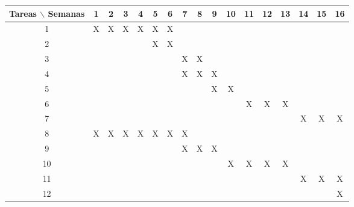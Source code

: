 \documentclass[preprint]{aastex62}
\begin{document}
  \begin{table}[htb]
    \begin{tabular}{|c|cccccccccccccccc| }
      \hline
      Tareas $\backslash$ Semanas & 1 & 2 & 3 & 4 & 5 & 6 & 7 & 8 & 9 & 10 & 11 & 12 & 13 & 14 & 15 & 16  \\
      \hline
      1 & X & X & X & X & X & X &   &   &   &   &   &   &   &   &   &   \\
      2 &   &   &   &   & X & X &   &   &   &   &   &   &   &   &   &   \\
      3 &   &   &   &   &   &   & X & X &   &   &   &   &   &   &   &   \\
      4 &   &   &   &   &   &   & X & X & X &   &   &   &   &   &   &   \\
      5 &   &   &   &   &   &   &   &   & X & X &   &   &   &   &   &   \\
      6 &   &   &   &   &   &   &   &   &   &   & X & X & X &   &   &   \\
      7 &   &   &   &   &   &   &   &   &   &   &   &   &   & X & X & X \\
      8 & X & X & X & X & X & X & X &   &   &   &   &   &   &   &   &   \\
      9 &   &   &   &   &   &   & X & X & X &   &   &   &   &   &   &   \\
      10&   &   &   &   &   &   &   &   &   & X & X & X & X &   &   &   \\
      11&   &   &   &   &   &   &   &   &   &   &   &   &   & X & X & X \\
      12&   &   &   &   &   &   &   &   &   &   &   &   &   &   &   & X \\
      \hline
    \end{tabular}
  \end{table}
\end{document}
